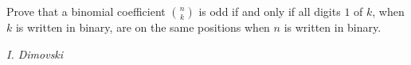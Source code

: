 Prove that a binomial coefficient $\binom nk$ is odd if and only if all digits $1$ of $k$, when $k$ is written in binary, are on the same positions when $n$ is written in binary.

\textit{I. Dimovski}